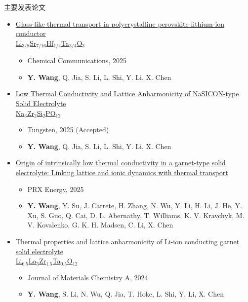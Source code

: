 \documentclass{resume} %
\begin{document}
\begin{rSection}{主要发表论文}

\begin{itemize}
\item \href{https://doi.org/10.1039/D5CC04693A}{Glass-like thermal transport in polycrystalline perovskite lithium-ion conductor \\ Li$_{3/8}$Sr$_{7/16}$Hf$_{1/4}$Ta$_{3/4}$O$_3$}
    \begin{itemize}
        \item Chemical Communications, 2025
        \item \textbf{Y. Wang}, Q. Jia, S. Li, L. Shi, Y. Li, X. Chen
    \end{itemize}

\item \href{https://doi.org/10.1007/s42864-025-00357-6}{Low Thermal Conductivity and Lattice Anharmonicity of NaSICON-type Solid Electrolyte \\ Na$_3$Zr$_2$Si$_2$PO$_{12}$}
    \begin{itemize}
        \item Tungsten, 2025 (Accepted)
        \item \textbf{Y. Wang}, Q. Jia, S. Li, L. Shi, Y. Li, X. Chen
    \end{itemize}

\item \href{https://doi.org/10.1103/6wj2-kzhh}{Origin of intrinsically low thermal conductivity in a garnet-type solid electrolyte: Linking lattice and ionic dynamics with thermal transport}
    \begin{itemize}
        \item PRX Energy, 2025
        \item \textbf{Y. Wang}, Y. Su, J. Carrete, H. Zhang, N. Wu, Y. Li, H. Li, J. He, Y. Xu, S. Guo, Q. Cai, D. L. Abernathy, T. Williams, K. V. Kravchyk, M. V. Kovalenko, G. K. H. Madsen, C. Li, X. Chen
    \end{itemize}

\item \href{https://doi.org/10.1039/D4TA02264E}{Thermal properties and lattice anharmonicity of Li-ion conducting garnet solid electrolyte \\ Li$_{6.5}$La$_3$Zr$_{1.5}$Ta$_{0.5}$O$_{12}$}
    \begin{itemize}
        \item Journal of Materials Chemistry A, 2024
        \item \textbf{Y. Wang}, S. Li, N. Wu, Q. Jia, T. Hoke, L. Shi, Y. Li, X. Chen
    \end{itemize}


\end{itemize}
\end{rSection}
\end{document}
